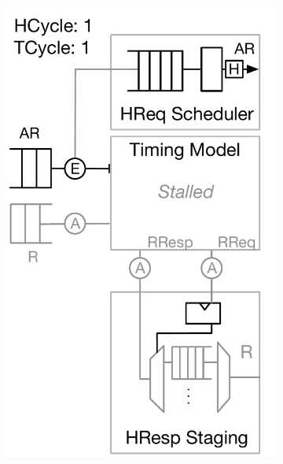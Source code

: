 \begin{figure}
\begin{subfigure}[t]{0.23\textwidth}
        \caption{}
        \label{fig:model-operation-1}
    \end{subfigure}
    \begin{subfigure}[t]{0.24\textwidth}
        \includegraphics[width=\columnwidth]{figures/model-operation-2.pdf}
        \caption{}
        \label{fig:model-operation-2}
    \end{subfigure}
    \begin{subfigure}[t]{0.24\textwidth}

\end{subfigure}
\end{figure}
